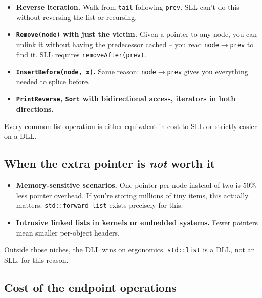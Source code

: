 \documentclass[11pt]{article}
\begin{document}
\begin{ideabox}
\begin{itemize}[leftmargin=*]
  \item \textbf{Reverse iteration.} Walk from \texttt{tail}
        following \texttt{prev}. SLL can't do this without
        reversing the list or recursing.
  \item \textbf{\texttt{Remove(node)} with just the victim.} Given a
        pointer to any node, you can unlink it without having the
        predecessor cached -- you read \texttt{node$\to$prev} to
        find it. SLL requires \texttt{removeAfter(prev)}.
  \item \textbf{\texttt{InsertBefore(node, x)}.} Same reason:
        \texttt{node$\to$prev} gives you everything needed to
        splice before.
  \item \textbf{\texttt{PrintReverse}, \texttt{Sort} with
        bidirectional access, iterators in both directions.}
\end{itemize}
Every common list operation is either equivalent in cost to SLL or
strictly easier on a DLL.
\end{ideabox}

\subsection{When the extra pointer is \emph{not} worth it}

\begin{warnbox}
\begin{itemize}[leftmargin=*]
  \item \textbf{Memory-sensitive scenarios.} One pointer per node
        instead of two is 50\% less pointer overhead. If you're
        storing millions of tiny items, this actually matters.
        \texttt{std::forward\_list} exists precisely for this.
  \item \textbf{Intrusive linked lists in kernels or embedded
        systems.} Fewer pointers mean smaller per-object headers.
\end{itemize}
Outside those niches, the DLL wins on ergonomics. \texttt{std::list}
is a DLL, not an SLL, for this reason.
\end{warnbox}

\subsection{Cost of the endpoint operations}
\end{document}
